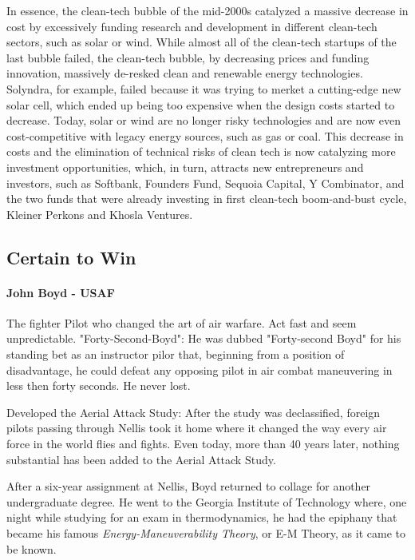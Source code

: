 In essence, the clean-tech bubble of the mid-2000s catalyzed a massive decrease
in cost by excessively funding research and development in different clean-tech
sectors, such as solar or wind. While almost all of the clean-tech startups of
the last bubble failed, the clean-tech bubble, by decreasing prices and funding
innovation, massively de-resked clean and renewable energy technologies.
Solyndra, for example, failed because it was trying to merket a cutting-edge
new solar cell, which ended up being too expensive when the design costs started
to decrease. Today, solar or wind are no longer risky technologies and are now
even cost-competitive with legacy energy sources, such as gas or coal. This
decrease in costs and the elimination of technical risks of clean tech is now
catalyzing more investment opportunities, which, in turn, attracts new
entrepreneurs and investors, such as Softbank, Founders Fund, Sequoia Capital,
Y Combinator, and the two funds that were already investing in first clean-tech
boom-and-bust cycle, Kleiner Perkons and Khosla Ventures.


\subsection{Certain to Win}

\paragraph{John Boyd - USAF}
The fighter Pilot who changed the art of air warfare. Act fast and seem
unpredictable. "Forty-Second-Boyd": He was dubbed "Forty-second Boyd" for his
standing bet as an instructor pilor that, beginning from a position of
disadvantage, he could defeat any opposing pilot in air combat maneuvering
in less then forty seconds. He never lost.

\vspace{1\baselineskip}

Developed the Aerial Attack Study: After the study was declassified, foreign
pilots passing through Nellis took it home where it changed the way every air
force in the world flies and fights. Even today, more than 40 years later,
nothing substantial has been added to the Aerial Attack Study.

\vspace{1\baselineskip}

After a six-year assignment at Nellis, Boyd returned to collage for another
undergraduate degree. He went to the Georgia Institute of Technology where, one
night while studying for an exam in thermodynamics, he had the epiphany that
became his famous \textit{Energy-Maneuverability Theory}, or E-M Theory, as it
came to be known.

